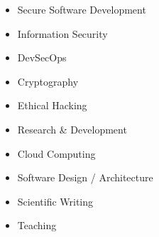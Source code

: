 


    \sidedivider


    \sidedivider



    \smallskip
    \smallskip
    \smallskip

\smallskip
{}

    \begin{itemize}
        \item Secure Software Development
        \item Information Security
        \item DevSecOps
        \item Cryptography
        \item Ethical Hacking
        \item Research \& Development
        \item Cloud Computing
        \item Software Design / Architecture
        \item Scientific Writing
        \item Teaching
    \end{itemize}


